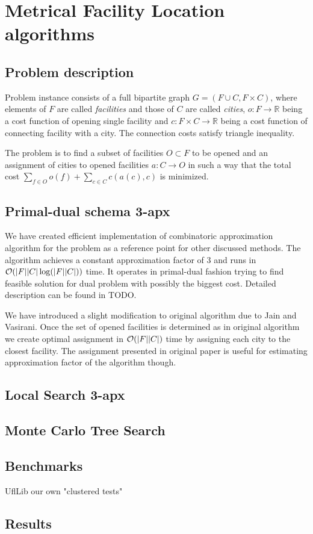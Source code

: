 \chapter{Metrical Facility Location algorithms}

\section{Problem description}

Problem instance consists of a full bipartite graph $G = (F \cup C, F \times
C)$, where elements of $F$ are called \emph{facilities} and those of $C$ are
called \emph{cities}, $o : F \to \mathbb{R}$ being a cost function of opening
single facility and $c : F \times C \to \mathbb{R}$ being a cost function of
connecting facility with a city. The connection costs satisfy triangle
inequality.

The problem is to find a subset of facilities $O \subset F$ to be opened and an
assignment of cities to opened facilities $a : C \to O$ in such a way that the
total cost $\sum_{f \in O} o(f) + \sum_{c \in C} c(a(c), c)$ is minimized.

\section{Primal-dual schema 3-apx}
We have created efficient implementation of combinatoric approximation
algorithm for the problem as a reference point for other discussed methods. The
algorithm achieves a constant approximation factor of 3 and runs in $\mathcal{O}(|F||C|
\log(|F||C|))$ time. It operates in primal-dual fashion trying to find feasible
solution for dual problem with possibly the biggest cost. Detailed description
can be found in TODO. %

We have introduced a slight modification to original algorithm due to Jain and
Vasirani. Once the set of opened facilities is determined as in original
algorithm we create optimal assignment in $\mathcal{O}(|F||C|)$ time by assigning each
city to the closest facility. The assignment presented in original paper is
useful for estimating approximation factor of the algorithm though.

\section{Local Search 3-apx}

\section{Monte Carlo Tree Search}

\section{Benchmarks}
UflLib our own "clustered tests"

\section{Results}

